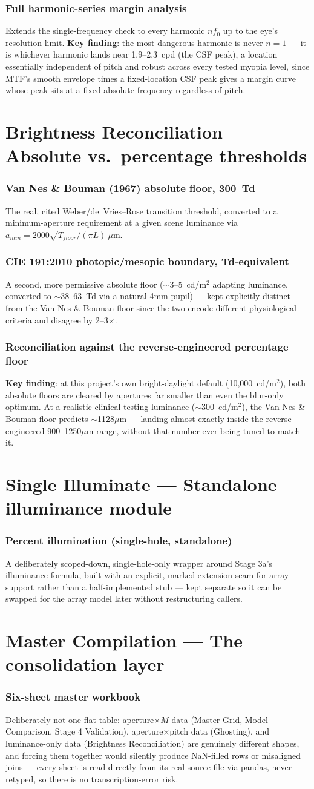 \documentclass[10pt]{report}
\newcommand{\feat}[1]{\subsection*{#1}}
\begin{document}
\feat{Full harmonic-series margin analysis}
Extends the single-frequency check to every harmonic $n f_0$ up to the eye's resolution limit. \textbf{Key finding}: the most dangerous harmonic is never $n=1$ --- it is whichever harmonic lands near 1.9--2.3~cpd (the CSF peak), a location essentially independent of pitch and robust across every tested myopia level, since MTF's smooth envelope times a fixed-location CSF peak gives a margin curve whose peak sits at a fixed absolute frequency regardless of pitch.

\chapter{Brightness Reconciliation --- Absolute vs.\ percentage thresholds}
\feat{Van Nes \& Bouman (1967) absolute floor, 300~Td}
The real, cited Weber/de~Vries--Rose transition threshold, converted to a minimum-aperture requirement at a given scene luminance via $a_{min}=2000\sqrt{T_{floor}/(\pi L)}\,\mu$m.

\feat{CIE 191:2010 photopic/mesopic boundary, Td-equivalent}
A second, more permissive absolute floor ($\sim$3--5~cd/m$^2$ adapting luminance, converted to $\sim$38--63~Td via a natural 4mm pupil) --- kept explicitly distinct from the Van Nes \& Bouman floor since the two encode different physiological criteria and disagree by 2--3$\times$.

\feat{Reconciliation against the reverse-engineered percentage floor}
\textbf{Key finding}: at this project's own bright-daylight default (10{,}000~cd/m$^2$), both absolute floors are cleared by apertures far smaller than even the blur-only optimum. At a realistic clinical testing luminance ($\sim$300~cd/m$^2$), the Van Nes \& Bouman floor predicts $\sim$1128$\mu$m --- landing almost exactly inside the reverse-engineered 900--1250$\mu$m range, without that number ever being tuned to match it.

\chapter{Single Illuminate --- Standalone illuminance module}
\feat{Percent illumination (single-hole, standalone)}
A deliberately scoped-down, single-hole-only wrapper around Stage 3a's illuminance formula, built with an explicit, marked extension seam for array support rather than a half-implemented stub --- kept separate so it can be swapped for the array model later without restructuring callers.

\chapter{Master Compilation --- The consolidation layer}
\feat{Six-sheet master workbook}
Deliberately not one flat table: aperture$\times M$ data (Master Grid, Model Comparison, Stage 4 Validation), aperture$\times$pitch data (Ghosting), and luminance-only data (Brightness Reconciliation) are genuinely different shapes, and forcing them together would silently produce NaN-filled rows or misaligned joins --- every sheet is read directly from its real source file via pandas, never retyped, so there is no transcription-error risk.
\end{document}

